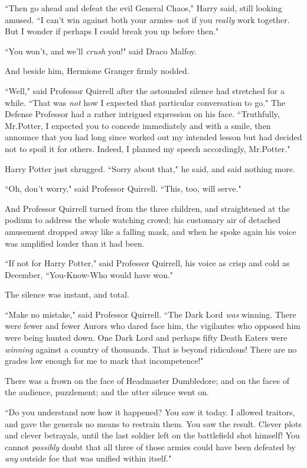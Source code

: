 ``Then go ahead and defeat the evil General Chaos," Harry said, still looking amused. ``I can't win against both your armies\---not if you \emph{really} work together. But I wonder if perhaps I could break you up before then."

``You won't, and we'll \emph{crush} you!" said Draco Malfoy.

And beside him, Hermione Granger firmly nodded.

``Well," said Professor Quirrell after the astounded silence had stretched for a while. ``That was \emph{not} how I expected that particular conversation to go." The Defense Professor had a rather intrigued expression on his face. ``Truthfully, Mr.\?Potter, I expected you to concede immediately and with a smile, then announce that you had long since worked out my intended lesson but had decided not to spoil it for others. Indeed, I planned my speech accordingly, Mr.\?Potter."

Harry Potter just shrugged. ``Sorry about that," he said, and said nothing more.

``Oh, don't worry," said Professor Quirrell. ``This, too, will serve."

And Professor Quirrell turned from the three children, and straightened at the podium to address the whole watching crowd; his customary air of detached amusement dropped away like a falling mask, and when he spoke again his voice was amplified louder than it had been.

``If not for Harry Potter," said Professor Quirrell, his voice as crisp and cold as December, ``You-Know-Who would have won."

The silence was instant, and total.

\later

``Make no mistake," said Professor Quirrell. ``The Dark Lord \emph{was} winning. There were fewer and fewer Aurors who dared face him, the vigilantes who opposed him were being hunted down. One Dark Lord and perhaps fifty Death Eaters were \emph{winning} against a country of thousands. That is beyond ridiculous! There are no grades low enough for me to mark that incompetence!"

There was a frown on the face of Headmaster Dumbledore; and on the faces of the audience, puzzlement; and the utter silence went on.

``Do you understand now how it happened? You saw it today. I allowed traitors, and gave the generals no means to restrain them. You saw the result. Clever plots and clever betrayals, until the last soldier left on the battlefield shot himself! You cannot \emph{possibly} doubt that all three of those armies could have been defeated by \emph{any} outside foe that was unified within itself."

